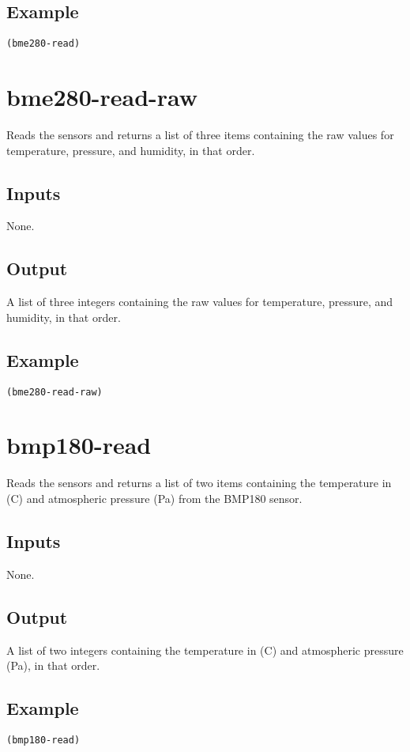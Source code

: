\documentclass[10pt, openany]{book}
\begin{document}
\subsection{Example}
\begin{lstlisting}
(bme280-read)
\end{lstlisting}

\section{bme280-read-raw}
Reads the sensors and returns a list of three items containing the raw  values for temperature, pressure, and humidity, in that order.
\subsection{Inputs}
None.
\subsection{Output}
A list of three integers containing the raw values for temperature, pressure, and humidity, in that order.
\subsection{Example}
\begin{lstlisting}
(bme280-read-raw)
\end{lstlisting}

\section{bmp180-read}
Reads the sensors and returns a list of two items containing the temperature in (\degree{}C) and atmospheric pressure (Pa) from the BMP180 sensor.
\subsection{Inputs}
None.
\subsection{Output}
A list of two integers containing the temperature in (\degree{}C) and atmospheric pressure (Pa), in that order.
\subsection{Example}
\begin{lstlisting}
(bmp180-read)
\end{lstlisting}
\end{document}
